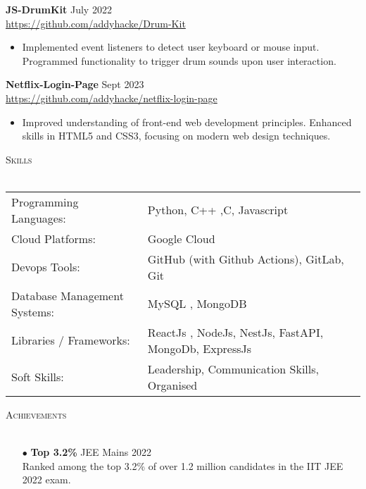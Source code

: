 \documentclass[a4paper]{article}
\newcommand{\lineunder} {
    \vspace*{-8pt} \\
    \hspace*{-18pt} \hrulefill \\
}
\newcommand{\header} [1] {
    {\hspace*{-18pt}\vspace*{6pt} \textsc{#1}}
    \vspace*{-6pt} \lineunder
}
\begin{document}
{\textbf{JS-DrumKit} \hfill July 2022 \\
\vspace{-1mm}
\url{https://github.com/addyhacke/Drum-Kit} \\
\vspace{-4mm}
\begin{itemize} 
	\item Implemented event listeners to detect user keyboard or mouse input.
Programmed functionality to trigger drum sounds upon user interaction.
\end{itemize}

{\textbf{Netflix-Login-Page}} \hfill Sept 2023 \\
\vspace{-1mm}
\url{https://github.com/addyhacke/netflix-login-page} \\
\vspace{-4mm}
\begin{itemize} 
	\item Improved understanding of front-end web development principles.
Enhanced skills in HTML5 and CSS3, focusing on modern web design techniques.
\end{itemize}


\header{Skills}
\vspace{4mm}
\begin{tabular}{ l l }
	Programming Languages: & Python, C++ ,C, Javascript  \\
	Cloud Platforms:        & Google Cloud  \\
	Devops Tools:  & GitHub (with Github Actions), GitLab, Git \\
	Database Management Systems: & MySQL , MongoDB \\ 
	Libraries / Frameworks: & ReactJs , NodeJs, NestJs, FastAPI, MongoDb, ExpressJs        \\
	Soft Skills:           &  Leadership, Communication Skills, Organised  \\
	
\end{tabular}


\vspace{7mm}
\header{Achievements}
\vspace{4mm}
\begin{itemize}
    \item[$\bullet$] \textbf{Top 3.2\%} \hfill JEE Mains 2022\\
    Ranked among the top 3.2\% of over 1.2 million candidates in the IIT JEE 2022 exam.
    

\end{itemize}}
\end{document}
